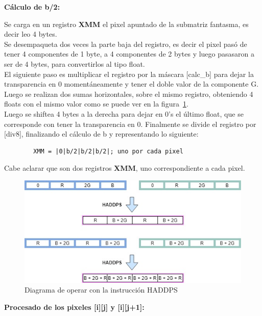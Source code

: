 {\centering\textbf{Cálculo de b/2:}}

Se carga en un registro \textbf{XMM} el pixel apuntado de la submatriz fantasma, es decir leo 4 bytes. \\
Se desempaqueta dos veces la parte baja del registro, es decir el pixel pasó de tener 4 componentes de 1 byte, a 4 componentes de 2 bytes y luego pasasaron a ser de 4 bytes, para convertirlos al tipo float. \\
El siguiente paso es multiplicar el registro por la máscara [calc\_b] para dejar la transparencia en 0 momentáneamente y tener el doble valor de la componente G. \\
Luego se realizan dos sumas horizontales, sobre el mismo registro, obteniendo 4 floats con el mismo valor como se puede ver en la figura~\ref{sumah}. \\
Luego se shiftea 4 bytes a la derecha para dejar en 0's el último float, que se corresponde con tener la transparencia en 0.
Finalmente se divide el registro por [div8], finalizando el cálculo de b y representando lo siguiente:
\begin{codesnippet}
\begin{verbatim}
        XMM = |0|b/2|b/2|b/2|; uno por cada pixel
\end{verbatim}
\end{codesnippet}
Cabe aclarar que son dos registros \textbf{XMM}, uno correspondiente a cada pixel.

\begin{figure}[h]
  \begin{center}
	\includegraphics[scale=0.5]{img/haddps.jpg}
	\caption{Diagrama de operar con la instrucción HADDPS}
	\label{sumah}
  \end{center}
\end{figure}

{\centering\textbf{Procesado de los pixeles [i][j] y [i][j+1]:}}

